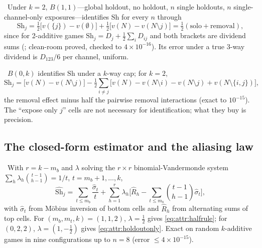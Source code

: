 \begin{corollary}
\label{attr:cor:pairwise}
\tagEstablished\ Under $k = 2$, $B(1,1)$---global holdout, no holdout, $n$ single holdouts, $n$ single-channel-only exposures---identifies $\mathrm{Sh}$ for every $n$ through
\begin{equation}
\mathrm{Sh}_j = \tfrac12\big[v(\{j\}) - v(\emptyset)\big] + \tfrac12\big[v(N) - v(N \setminus j)\big] = \tfrac12(\text{solo} + \text{removal}),
\label{eq:attr:halfrule}
\end{equation}
since for 2-additive games $\mathrm{Sh}_j = D_j + \tfrac12\sum_i D_{ij}$ and both brackets are dividend sums (; clean-room proved, checked to $4\times10^{-16}$). Its error under a true 3-way dividend is $D_{123}/6$ per channel, uniform.
\end{corollary}

\begin{corollary}
\label{attr:cor:holdout}
\tagEstablished\ $B(0,k)$ identifies $\mathrm{Sh}$ under a $k$-way cap; for $k = 2$,
\begin{equation}
\mathrm{Sh}_j = \big[v(N) - v(N \setminus j)\big] - \tfrac12\sum_{i \ne j}\big[v(N) - v(N \setminus i) - v(N \setminus j) + v(N \setminus \{i,j\})\big],
\label{eq:attr:holdoutonly}
\end{equation}
the removal effect minus half the pairwise removal interactions (exact to $10^{-15}$). The ``expose only $j$'' cells are not necessary for identification; what they buy is precision.
\end{corollary}

\subsection{The closed-form estimator and the aliasing law}

\begin{construction}
\label{attr:con:estimator}
\tagEstablished\ With $r = k - m_b$ and $\lambda$ solving the $r \times r$ binomial-Vandermonde system $\sum_h \lambda_h \binom{t-1}{h-1} = 1/t$, $t = m_b + 1, \ldots, k$,
\begin{equation}
\hat{\mathrm{Sh}}_j = \sum_{t \le m_b} \frac{\hat\sigma_t}{t} + \sum_{h=1}^{r} \lambda_h\Big[\hat R_h - \sum_{t \le m_b}\binom{t-1}{h-1}\hat\sigma_t\Big],
\label{eq:attr:estimator}
\end{equation}
with $\hat\sigma_t$ from M\"obius inversion of bottom cells and $\hat R_h$ from alternating sums of top cells. For $(m_b, m_t, k) = (1,1,2)$, $\lambda = \tfrac12$ gives \cref{eq:attr:halfrule}; for $(0,2,2)$, $\lambda = (1, -\tfrac12)$ gives \cref{eq:attr:holdoutonly}. Exact on random $k$-additive games in nine configurations up to $n = 8$ (error $\le 4\times10^{-15}$).
\end{construction}

